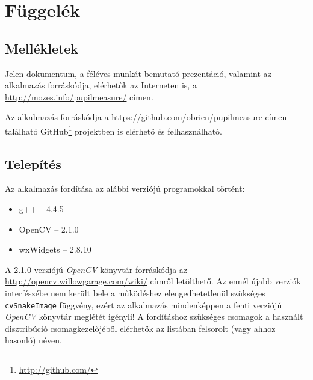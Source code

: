 \appendix
\chapter*{Függelék}
\setcounter{chapter}{6}  %
\setcounter{equation}{0} %
\setcounter{footnote}{0}

\section{Mellékletek}\label{sect:mellekletek}

Jelen dokumentum, a féléves munkát bemutató prezentáció, valamint az alkalmazás forráskódja, elérhetők az Interneten is, a \url{http://mozes.info/pupilmeasure/} címen.

Az alkalmazás forráskódja a \url{https://github.com/obrien/pupilmeasure} címen található GitHub\footnote{\url{http://github.com/}} projektben is elérhető és felhasználható.

\section{Telepítés}\label{sect:telepites}

Az alkalmazás fordítása az alábbi verziójú programokkal történt:

\begin{itemize}
\item g++ --  4.4.5
\item OpenCV -- 2.1.0
\item wxWidgets -- 2.8.10
\end{itemize}

A  2.1.0 verziójú \textit{OpenCV} könyvtár forráskódja az \url{http://opencv.willowgarage.com/wiki/} címről letölthető. Az ennél újabb verziók interfészébe nem került bele a működéshez elengedhetetlenül szükséges \texttt{cvSnakeImage} függvény, ezért az alkalmazás mindenképpen a fenti verziójú \textit{OpenCV} könyvtár meglétét igényli! A fordításhoz szükséges csomagok a használt disztribúció csomagkezelőjéből elérhetők az  listában felsorolt (vagy ahhoz hasonló) néven.

